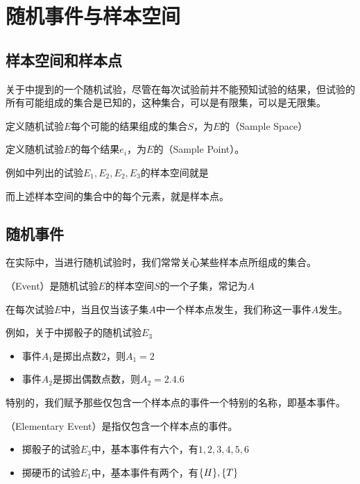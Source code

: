 \section{随机事件与样本空间}

\subsection{样本空间和样本点}
关于中提到的一个随机试验，尽管在每次试验前并不能预知试验的结果，但试验的所有可能组成的集合是已知的，这种集合，可以是有限集，可以是无限集。
\begin{BoxDefinition}[样本空间]
    定义随机试验$E$每个可能的结果组成的集合$S$，为$E$的（Sample Space）
\end{BoxDefinition}
\begin{BoxDefinition}[样本点]
    定义随机试验$E$的每个结果$e_i$，为$E$的（Sample Point）。
\end{BoxDefinition}

例如中列出的试验$E_1,E_2,E_2,E_3$的样本空间就是
而上述样本空间的集合中的每个元素，就是样本点。

\subsection{随机事件}
在实际中，当进行随机试验时，我们常常关心某些样本点所组成的集合。
\begin{BoxDefinition}[随机事件]
    （Event）是随机试验$E$的样本空间$S$的一个子集，常记为$A$

    在每次试验$E$中，当且仅当该子集$A$中一个样本点发生，我们称这一事件$A$发生。
\end{BoxDefinition}

例如，关于中掷骰子的随机试验$E_3$
\begin{itemize}
    \item 事件$A_1$是掷出点数$2$，则$A_1=\qty{2}$
    \item 事件$A_2$是掷出偶数点数，则$A_2=\qty{2,4,6}$
\end{itemize}
特别的，我们赋予那些仅包含一个样本点的事件一个特别的名称，即基本事件。
\begin{BoxDefinition}[基本事件]
    （Elementary Event）是指仅包含一个样本点的事件。
\end{BoxDefinition}
\begin{itemize}
    \item 掷骰子的试验$E_3$中，基本事件有六个，有$\qty{1},\qty{2},\qty{3},\qty{4},\qty{5},\qty{6}$
    \item 掷硬币的试验$E_1$中，基本事件有两个，有$\qty{H},\qty{T}$
\end{itemize}

